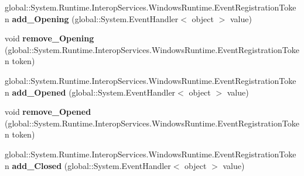\begin{DoxyCompactItemize}
\item 
\mbox{\label{interface_windows_1_1_u_i_1_1_xaml_1_1_controls_1_1_primitives_1_1_i_flyout_base_a2d94b89f80d0c8f635b98b2c6886a573}} 
global\+::\+System.\+Runtime.\+Interop\+Services.\+Windows\+Runtime.\+Event\+Registration\+Token {\bfseries add\+\_\+\+Opening} (global\+::\+System.\+Event\+Handler$<$ object $>$ value)
\item 
\mbox{\label{interface_windows_1_1_u_i_1_1_xaml_1_1_controls_1_1_primitives_1_1_i_flyout_base_acf6768490edf1a9db765685184ebccf0}} 
void {\bfseries remove\+\_\+\+Opening} (global\+::\+System.\+Runtime.\+Interop\+Services.\+Windows\+Runtime.\+Event\+Registration\+Token token)
\item 
\mbox{\label{interface_windows_1_1_u_i_1_1_xaml_1_1_controls_1_1_primitives_1_1_i_flyout_base_a7f385a5013f8ec0a8b1a6d77d6a84a3c}} 
global\+::\+System.\+Runtime.\+Interop\+Services.\+Windows\+Runtime.\+Event\+Registration\+Token {\bfseries add\+\_\+\+Opened} (global\+::\+System.\+Event\+Handler$<$ object $>$ value)
\item 
\mbox{\label{interface_windows_1_1_u_i_1_1_xaml_1_1_controls_1_1_primitives_1_1_i_flyout_base_aaf1d9a6eb5c861ece4f282be39177530}} 
void {\bfseries remove\+\_\+\+Opened} (global\+::\+System.\+Runtime.\+Interop\+Services.\+Windows\+Runtime.\+Event\+Registration\+Token token)
\item 
\mbox{\label{interface_windows_1_1_u_i_1_1_xaml_1_1_controls_1_1_primitives_1_1_i_flyout_base_a287be71b4a8d75e70c344f8fb9181cda}} 
global\+::\+System.\+Runtime.\+Interop\+Services.\+Windows\+Runtime.\+Event\+Registration\+Token {\bfseries add\+\_\+\+Closed} (global\+::\+System.\+Event\+Handler$<$ object $>$ value)
\item 
\mbox{\label{interface_windows_1_1_u_i_1_1_xaml_1_1_controls_1_1_primitives_1_1_i_flyout_base_a2325f07fa64baf0f9a5db42d74dc2072}} 

\end{DoxyCompactItemize}
